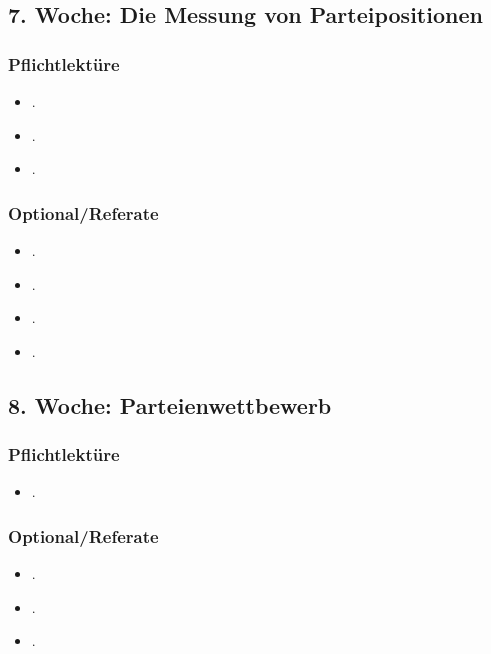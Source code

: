 \documentclass[abstract=on,parskip=full,headings=standardclasses,fontsize=11pt,paper=a4]{scrartcl}
\begin{document}
\subsection{7. Woche: Die Messung von Parteipositionen}

\subsubsection*{Pflichtlektüre}
\begin{itemize}
\item {}.
\item {}.
\item {}.
\end{itemize}


\subsubsection*{Optional/Referate}
\begin{itemize}
\item {}.
\item {}.
\item {}.
\item {}.
\end{itemize}



\subsection{8. Woche: Parteienwettbewerb}

\subsubsection*{Pflichtlektüre}
\begin{itemize}
\item {}.
\end{itemize}

\subsubsection*{Optional/Referate}
\begin{itemize}
\item {}.
\item {}.
\item {}.
\end{itemize}
\end{document}
